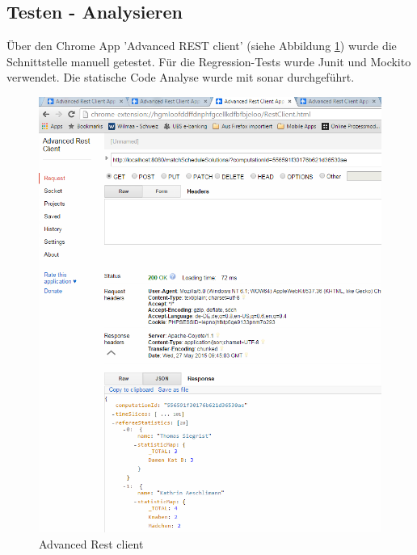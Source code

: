 \subsection{Testen - Analysieren}
 Über den Chrome App 'Advanced REST client' (siehe Abbildung \ref{fig:advanced_rest_client})  wurde die Schnittstelle manuell getestet. Für die Regression-Tests wurde Junit und Mockito 
verwendet. Die statische Code Analyse wurde mit \gls{sonar} \cite{sonar} durchgeführt.

\begin{figure}[h]
\centering
\includegraphics[scale=0.7]{images/advanced_rest_client.png}
\caption[Advanced Rest client]{Advanced Rest client \selfmade{}}
\label{fig:advanced_rest_client}
\end{figure}